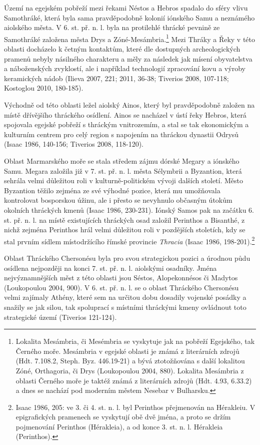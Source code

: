 Území na egejském pobřeží mezi řekami Néstos a Hebros spadalo do sféry vlivu Samothráké, která byla sama pravděpodobně kolonií iónského Samu a neznámého aiolského města. V 6. st. př. n. l. byla na protilehlé thrácké pevnině ze Samothráké založena města Drys a Zóné-Mesámbria.\footnote{Lokalita Mesámbria, či Mesémbria se vyskytuje jak na pobřeží Egejského, tak Černého moře. Mesámbria v egejské oblasti je známá z literárních zdrojů (Hdt. 7.108.2, Steph. Byz. 446.19-21) a bývá ztotožňována s další lokalitou Zóné, Orthagoria, či Drys (Loukopoulou 2004, 880). Lokalita Mesámbria z oblasti Černého moře je taktéž známá z literárních zdrojů (Hdt. 4.93, 6.33.2) a dnes se nachází pod moderním městem Nesebar v Bulharsku.} Mezi Thráky a Řeky v této oblasti docházelo k četným kontaktům, které dle dostupných archeologických pramenů nebyly násilného charakteru a měly za následek jak mísení obyvatelstva a náboženských zvyklostí, ale i například technologií zpracování kovu a výroby keramických nádob (Ilieva 2007, 221; 2011, 36-38; Tiverios 2008, 107-118; Kostoglou 2010, 180-185).

Východně od této oblasti ležel aiolský Ainos, který byl pravděpodobně založen na místě dřívějšího thráckého osídlení. Ainos se nacházel v ústí řeky Hebros, která spojovala egejské pobřeží s thráckým vnitrozemím, a stal se tak ekonomickým a kulturním centrem pro celý region s napojením na thráckou dynastii Odrysů (Isaac 1986, 140-156; Tiverios 2008, 118-120).

Oblast Marmarského moře se stala středem zájmu dórské Megary a iónského Samu. Megara založila již v 7. st. př. n. l. města Sélymbrii a Byzantion, která sehrála velmi důležitou roli v kulturně-politickém vývoji dalších století. Město Byzantion těžilo zejména ze své výhodné pozice, která mu umožňovala kontrolovat bosporskou úžinu, ale i přesto se nevyhnulo občasným útokům okolních thráckých kmenů (Isaac 1986, 230-231). Iónský Samos pak na začátku 6. st. př. n. l. na místě existujících thráckých osad založil Perinthos a Bisanthé, z nichž zejména Perinthos hrál velmi důležitou roli v pozdějších stoletích, kdy se stal prvním sídlem místodržícího římské provincie {\em Thracia} (Isaac 1986, 198-201).\footnote{Isaac 1986, 205: ve 3. či 4. st. n. l. byl Perinthos přejmenován na Hérakleiu. V epigrafických pramenech se vyskytují obě dvě jména, a proto se držím pojmenování Perinthos (Hérakleia), a od konce 3. st. n. l. Hérakleia (Perinthos).}

Oblast Thráckého Chersonésu byla pro svou strategickou pozici a úrodnou půdu osídlena nejpozději na konci 7. st. př. n. l. aiolskými osadníky. Jména nejvýznamnějších měst z této oblasti jsou Séstos, Alopekonnésos či Madytos (Loukopoulou 2004, 900). V 6. st. př. n. l. se o oblast Thráckého Chersonésu velmi zajímaly Athény, které sem na určitou dobu dosadily vojenské posádky a snažily se jak silou, tak spoluprací s místními thráckými kmeny ovládnout toto strategické území (Tiverios 121-124).

